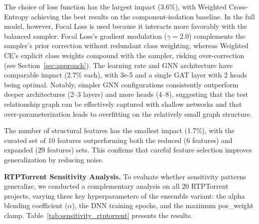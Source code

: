 The choice of loss function has the largest impact (3.6\%), with Weighted
Cross-Entropy achieving the best results on the component-isolation baseline.
In the full model, however, Focal Loss is used because it interacts more
favorably with the balanced sampler: Focal Loss's gradient modulation
($\gamma = 2.0$) complements the sampler's prior correction without
redundant class weighting, whereas Weighted CE's explicit class weights
compound with the sampler, risking over-correction (see
Section~\ref{sec:approach}). The learning rate and GNN architecture have
comparable impact (2.7\% each), with 3e-5 and a single GAT layer with 2
heads being optimal. Notably, simpler GNN
configurations consistently outperform deeper architectures (2--3 layers) and
more heads (4--8), suggesting that the test relationship graph can be
effectively captured with shallow networks and that over-parameterization leads
to overfitting on the relatively small graph structure.

The number of structural features has the smallest impact (1.7\%), with the
curated set of 10 features outperforming both the reduced (6 features) and
expanded (29 features) sets. This confirms that careful feature selection
improves generalization by reducing noise.

\textbf{RTPTorrent Sensitivity Analysis.}
To evaluate whether sensitivity patterns generalize, we conducted a
complementary analysis on all 20 RTPTorrent projects, varying three key
hyperparameters of the ensemble variant: the alpha blending coefficient
($\alpha$), the DNN training epochs, and the maximum pos\_weight clamp.
Table~\ref{tab:sensitivity_rtptorrent} presents the results.

